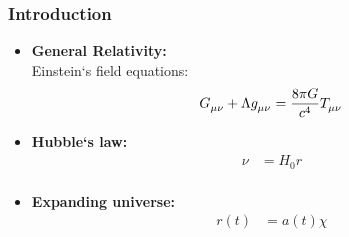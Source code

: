 \documentclass[8pt,hideothersubsections]{beamer}
\begin{document}
\begin{frame}
\frametitle{Introduction}
\begin{itemize}
\item \textbf{General Relativity:}\\
Einstein`s field equations:
\begin{equation}\label{eq:GR}
\begin{split}
\tensor{G}{_{\mu\nu}}+\Lambda\tensor{g}{_{\mu\nu}}&=\frac{8\pi G}{c^{4}}\tensor{T}{_{\mu\nu}}\\
\end{split}
\end{equation}
\item \textbf{Hubble`s law:}
\begin{equation}\label{eq:Hubble}
\begin{split}
\nu&=H_{0}r\\
\end{split}
\end{equation}
\item \textbf{Expanding universe:}
\begin{equation}\label{eq:scale}
\begin{split}
r(t) &= a(t)\chi\\
\end{split}
\end{equation}

\end{itemize}
\end{frame}
\end{document}
